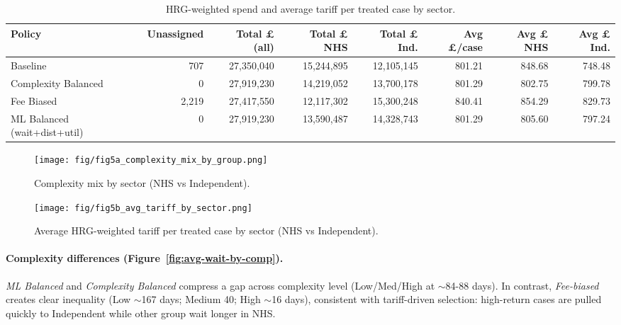 \documentclass[ %
                    author={Nattanan Nawakitbamrung},
                supervisor={Dr. Sébastien Rochat},
                    degree={MSc},
                     title={Developing and Evaluating the Impact of a Single Patient Treatment List (PTL) for an NHS Integrated Care System},
                  subtitle={},
                      type={},
                      year={2025}]{dissertation}
\begin{document}
\begin{table}[htbp]
\centering
\small
\setlength{\tabcolsep}{5pt}
\renewcommand{\arraystretch}{1.10}
\begin{adjustbox}{width=\linewidth}
\begin{tabular}{lrrrrrrr}
\toprule
\textbf{Policy} & \textbf{Unassigned} & \textbf{Total £ (all)} &
\textbf{Total £ NHS} & \textbf{Total £ Ind.} & \textbf{Avg £/case} &
\textbf{Avg £ NHS} & \textbf{Avg £ Ind.} \\
\midrule
Baseline & 707 & 27{,}350{,}040 & 15{,}244{,}895 & 12{,}105{,}145 & 801.21 & 848.68 & 748.48 \\
Complexity Balanced & 0 & 27{,}919{,}230 & 14{,}219{,}052 & 13{,}700{,}178 & 801.29 & 802.75 & 799.78 \\
Fee Biased & 2{,}219 & 27{,}417{,}550 & 12{,}117{,}302 & 15{,}300{,}248 & 840.41 & 854.29 & 829.73 \\
ML Balanced (wait+dist+util) & 0 & 27{,}919{,}230 & 13{,}590{,}487 & 14{,}328{,}743 & 801.29 & 805.60 & 797.24 \\
\bottomrule
\end{tabular}
\end{adjustbox}
\caption{HRG-weighted spend and average tariff per treated case by sector.}
\label{tab:tariff-by-policy}
\end{table}

\begin{figure}[htbp]
\centering
\texttt{[image: fig/fig5a\_complexity\_mix\_by\_group.png]}
\caption{Complexity mix by sector (NHS vs Independent).}
\label{fig:comp-mix}
\end{figure}

\begin{figure}[htbp]
\centering
\texttt{[image: fig/fig5b\_avg\_tariff\_by\_sector.png]}
\caption{Average HRG-weighted tariff per treated case by sector (NHS vs Independent).}
\label{fig:avg-tariff-sector}
\end{figure}

\paragraph{Complexity differences (Figure~\ref{fig:avg-wait-by-comp}).} \textit{ML Balanced} and \textit{Complexity Balanced} compress a gap across complexity level (Low/Med/High at $\sim$84-88 days). In contrast, \textit{Fee-biased} creates clear inequality (Low $\sim$167 days; Medium 40; High $\sim$16 days), consistent with tariff-driven selection: high-return cases are pulled quickly to Independent while other group wait longer in NHS.
\end{document}
